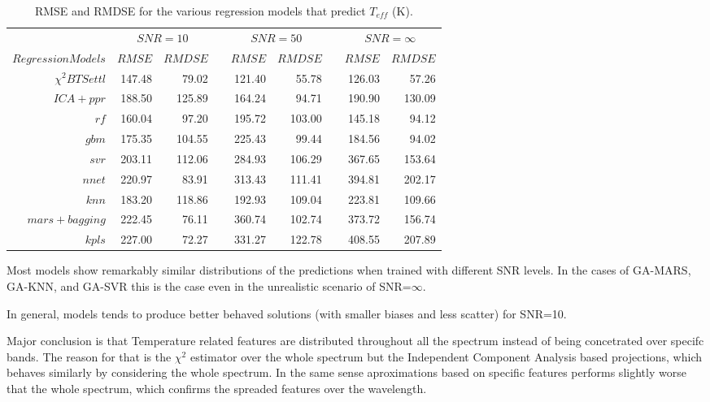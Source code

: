 \newcommand{\ra}[1]{\renewcommand{\arraystretch}{#1}}
\begin{table}\centering
\ra{1.3}
\begin{tabular}{@{}rrrcrrcrr@{}}\toprule
& \multicolumn{2}{c}{$SNR = 10$} & \phantom{ab}& \multicolumn{2}{c}{$SNR = 50$} &
\phantom{ab} & \multicolumn{2}{c}{$SNR = \infty$}\\
\cmidrule{2-3} \cmidrule{5-6} \cmidrule{8-9}
$Regression Models$ & $RMSE$ & $RMDSE$ && $RMSE$ & $RMDSE$ && $RMSE$ & $RMDSE$ \\ \midrule
$\chi^2 BTSettl$    &  147.48 & 79.02 && 121.40 & 55.78 && 126.03 & 57.26 \\
$ ICA+ ppr$         & 188.50 & 125.89 && 164.24 & 94.71 && 190.90 & 130.09 \\
$rf $               & 160.04 & 97.20 && 195.72 & 103.00 && 145.18 & 94.12 \\
$ gbm $             & 175.35 & 104.55 && 225.43 & 99.44 && 184.56 & 94.02 \\
$ svr $             & 203.11 & 112.06 && 284.93 & 106.29 && 367.65 & 153.64 \\
$ nnet $            & 220.97 & 83.91 && 313.43 & 111.41 && 394.81 & 202.17 \\
$ knn $             & 183.20 & 118.86 && 192.93 & 109.04 && 223.81 & 109.66  \\
$ mars+ bagging $   & 222.45 & 76.11 && 360.74 & 102.74 && 373.72 & 156.74 \\
$ kpls $            & 227.00 & 72.27 && 331.27 & 122.78 && 408.55 & 207.89 \\

\bottomrule
\end{tabular}
\caption {RMSE and RMDSE for the various regression models that predict $T_{eff}$ (K).} 
\label{tab:model_TSD} 
\end{table}


%

Most models show remarkably similar distributions of the
predictions when trained with different SNR levels. In the cases of
GA-MARS, GA-KNN, and GA-SVR this is the case even in the unrealistic
scenario of SNR=$\infty$.

In general, models tends to produce better behaved solutions (with
smaller biases and less scatter) for SNR=10. 

Major conclusion is that Temperature related features are distributed
throughout all the spectrum instead of being concetrated over specifc
bands. The reason for that is the $\chi^2$ estimator over the whole 
spectrum but the Independent Component Analysis based projections,
which behaves similarly by considering the whole spectrum.
In the same sense aproximations based on specific features performs
slightly worse that the whole spectrum, which confirms the spreaded 
features over the wavelength.

